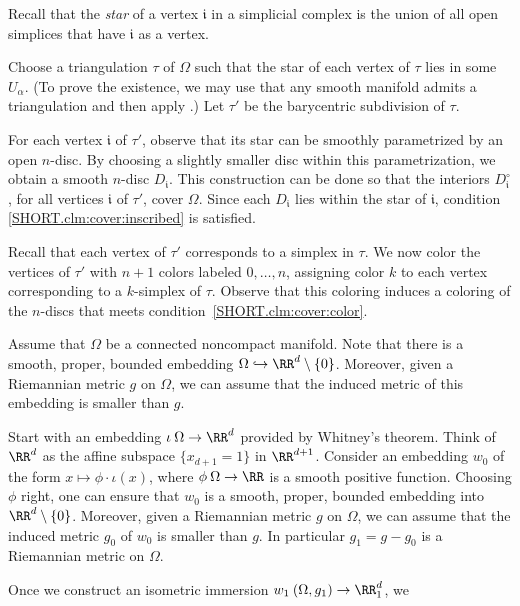 Recall that the \emph{star} of a vertex $\mathfrak{i}$ in a simplicial complex is the union of all open simplices that have $\mathfrak{i}$ as a vertex.

Choose a triangulation $\tau$ of $\Omega$ such that the star of each vertex of $\tau$ lies in some $U_\alpha$.
(To prove the existence, we may use that any smooth manifold admits a triangulation and then apply \cite[Theorem 35]{whitehead}.)
Let $\tau'$ be the barycentric subdivision of $\tau$.



For each vertex $\mathfrak{i}$ of $\tau'$, observe that its star can be smoothly parametrized by an open $n$-disc.
By choosing a slightly smaller disc within this parametrization, we obtain a smooth $n$-disc $D_{\mathfrak{i}}$.
This construction can be done so that the interiors $D_{\mathfrak{i}}^\circ$, for all vertices $\mathfrak{i}$ of $\tau'$, cover $\Omega$.
Since each $D_{\mathfrak{i}}$ lies within the star of $\mathfrak{i}$, condition \ref{SHORT.clm:cover:inscribed} is satisfied.



Recall that each vertex of $\tau'$ corresponds to a simplex in $\tau$.
We now color the vertices of $\tau'$ with $n+1$ colors labeled $0, \ldots, n$, assigning color $k$ to each vertex corresponding to a $k$-simplex of $\tau$.
Observe that this coloring induces a coloring of the $n$-discs that meets condition~\ref{SHORT.clm:cover:color}.
\qeds


Assume that $\Omega$ be a connected noncompact manifold.
Note that there is a smooth, proper, bounded embedding $\Omega\hookrightarrow\RR^d\setminus\{0\}$.
Moreover, given a Riemannian metric $g$ on $\Omega$, we can assume that the induced metric of this embedding is smaller than $g$.

Start with an embedding $\iota\:\Omega\to\RR^d$ provided by Whitney's theorem.
Think of $\RR^d$ as the affine subspace $\{x_{d+1} = 1\}$ in $\RR^{d+1}$.
Consider an embedding $w_0$ of the form $x \mapsto \phi \cdot \iota(x)$, where $\phi\:\Omega \to \RR$ is a smooth positive function.
Choosing $\phi$ right, one can ensure that $w_0$ is a smooth, proper, bounded embedding into $\RR^d\setminus\{0\}$.
Moreover, given a Riemannian metric $g$ on $\Omega$, we can assume that the induced metric $g_0$ of $w_0$ is smaller than $g$.
In particular $g_1=g-g_0$ is a Riemannian metric on $\Omega$.

Once we construct an isometric immersion $w_1\:(\Omega,g_1)\to \RR^d_1$, we


